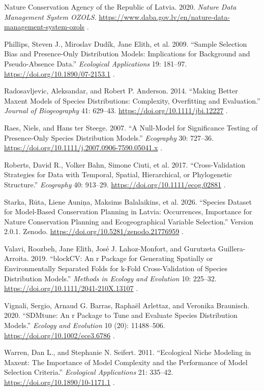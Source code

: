 \documentclass[
  openany]{book}
\makeatletter
\newlength{\cslhangindent}
\newenvironment{CSLReferences}[2] %
 {\begin{list}{}{%
  \setlength{\itemindent}{0pt}
  \setlength{\leftmargin}{0pt}
  \setlength{\parsep}{0pt}
  \ifodd #1
   \setlength{\leftmargin}{\cslhangindent}
   \setlength{\itemindent}{-1\cslhangindent}
  \fi
  \setlength{\itemsep}{#2\baselineskip}}}
 {\end{list}}
\def\uline#1{#1}
\DeclareRobustCommand{\EGV@ulineblue}[1]{%
  \begingroup
  \color{linkblue}\uline{#1}%
  \endgroup
}
\let\EGV@oldurl\url
\renewcommand{\url}[1]{%
  \EGV@ulineblue{\EGV@oldurl{#1}}%
}
\makeatother
\begin{document}
\begin{CSLReferences}{1}{1}
Nature Conservation Agency of the Republic of Latvia. 2020. \emph{Nature Data Management System OZOLS}. \url{https://www.daba.gov.lv/en/nature-data-management-system-ozols}.

Phillips, Steven J., Miroslav Dudík, Jane Elith, et al. 2009. {``Sample Selection Bias and Presence-Only Distribution Models: Implications for Background and Pseudo-Absence Data.''} \emph{Ecological Applications} 19: 181--97. \url{https://doi.org/10.1890/07-2153.1}.

Radosavljevic, Aleksandar, and Robert P. Anderson. 2014. {``Making Better Maxent Models of Species Distributions: Complexity, Overfitting and Evaluation.''} \emph{Journal of Biogeography} 41: 629--43. \url{https://doi.org/10.1111/jbi.12227}.

Raes, Niels, and Hans ter Steege. 2007. {``A Null-Model for Significance Testing of Presence-Only Species Distribution Models.''} \emph{Ecography} 30: 727--36. \url{https://doi.org/10.1111/j.2007.0906-7590.05041.x}.

Roberts, David R., Volker Bahn, Simone Ciuti, et al. 2017. {``Cross-Validation Strategies for Data with Temporal, Spatial, Hierarchical, or Phylogenetic Structure.''} \emph{Ecography} 40: 913--29. \url{https://doi.org/10.1111/ecog.02881}.

Starka, Rūta, Liene Auniņa, Maksims Balalaikins, et al. 2026. {``Species Dataset for Model-Based Conservation Planning in Latvia: Occurrences, Importance for Nature Conservation Planning and Ecogeographical Variable Selection.''} Version 2.0.1. Zenodo. \url{https://doi.org/10.5281/zenodo.21776959}.

Valavi, Roozbeh, Jane Elith, José J. Lahoz-Monfort, and Gurutzeta Guillera-Arroita. 2019. {``blockCV: An r Package for Generating Spatially or Environmentally Separated Folds for k-Fold Cross-Validation of Species Distribution Models.''} \emph{Methods in Ecology and Evolution} 10: 225--32. \url{https://doi.org/10.1111/2041-210X.13107}.

Vignali, Sergio, Arnaud G. Barras, Raphaël Arlettaz, and Veronika Braunisch. 2020. {``SDMtune: An r Package to Tune and Evaluate Species Distribution Models.''} \emph{Ecology and Evolution} 10 (20): 11488--506. \url{https://doi.org/10.1002/ece3.6786}.

Warren, Dan L., and Stephanie N. Seifert. 2011. {``Ecological Niche Modeling in Maxent: The Importance of Model Complexity and the Performance of Model Selection Criteria.''} \emph{Ecological Applications} 21: 335--42. \url{https://doi.org/10.1890/10-1171.1}.

\end{CSLReferences}
\end{document}
